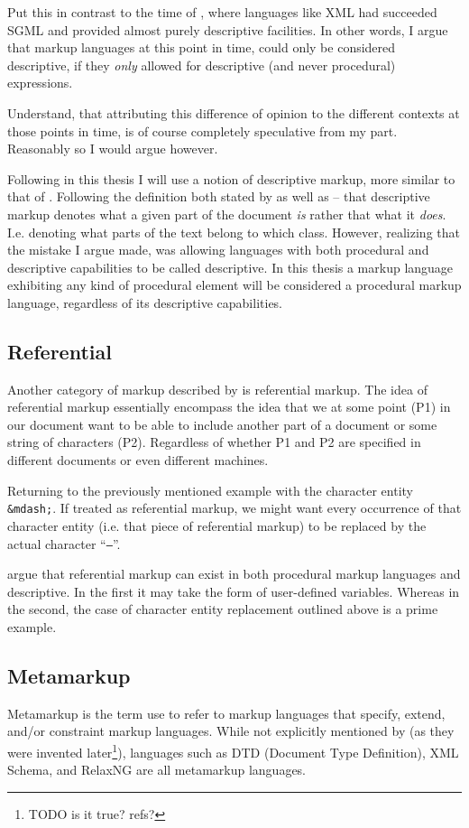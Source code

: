\documentclass{scrreprt}
\begin{document}
Put this in contrast to the time of \citet{bray}, where languages like XML had succeeded SGML and provided almost purely descriptive facilities. In other words, I argue that markup languages at this point in time, could only be considered descriptive, if they \emph{only} allowed for descriptive (and never procedural) expressions.

Understand, that attributing this difference of opinion to the different contexts at those points in time, is of course completely speculative from my part. Reasonably so I would argue however.

Following in this thesis I will use a notion of descriptive markup, more similar to that of \citet{bray}. Following the definition both stated by \citet{coombs} as well as \citet{bray} -- that descriptive markup denotes what a given part of the document \emph{is} rather that what it \emph{does}. I.e. denoting what parts of the text belong to which class. However, realizing that the mistake I argue \citet{coombs} made, was allowing languages with both procedural and descriptive capabilities to be called descriptive. In this thesis a markup language exhibiting any kind of procedural element will be considered a procedural markup language, regardless of its descriptive capabilities.


\subsection{Referential}
Another category of markup described by \citet{coombs} is referential markup. The idea of referential markup essentially encompass the idea that we at some point (P1) in our document want to be able to include another part of a document or some string of characters (P2). Regardless of whether P1 and P2 are specified in different documents or even different machines.

Returning to the previously mentioned example with the character entity \texttt{\&mdash;}. If treated as referential markup, we might want every occurrence of that character entity (i.e. that piece of referential markup) to be replaced by the actual character ``\texttt{--}''.

\citet{coombs} argue that referential markup can exist in both procedural markup languages and descriptive. In the first it may take the form of user-defined variables. Whereas in the second, the case of character entity replacement outlined above is a prime example.


\subsection{Metamarkup}
Metamarkup is the term \citet{coombs} use to refer to markup languages that specify, extend, and/or constraint markup languages. While not explicitly mentioned by \cite{coombs} (as they were invented later\footnote{TODO is it true? refs?}), languages such as DTD (Document Type Definition), XML Schema, and RelaxNG are all metamarkup languages.
\end{document}
